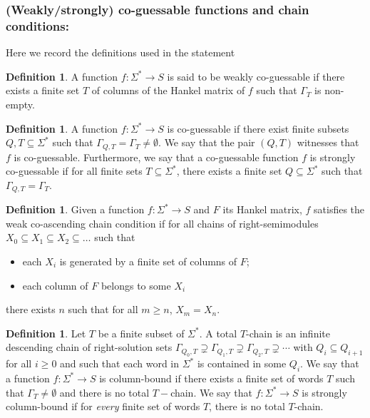 \documentclass[10pt,a4paper]{amsart}
\theoremstyle{definition}
\newtheorem{defi}[thm]{Definition}
\numberwithin{equation}{section}
\numberwithin{theorem}{section}
\begin{document}
\subsubsection*{\textbf{(Weakly/strongly) co-guessable functions and chain conditions:}}
Here we record the definitions used in the statement
\begin{defi}
A function $f: \Sigma^* \rightarrow S$ is said to be weakly co-guessable if there exists a finite set $T$ of columns of the Hankel matrix of $f$ such that $\Gamma_T$ is non-empty.	
\end{defi}

\begin{defi}
	A function $f: \Sigma^* \rightarrow S$ is co-guessable if there exist finite subsets $Q, T \subseteq \Sigma^*$ such that $\Gamma_{Q,T} = \Gamma_{T} \neq \emptyset$. We say that the pair $(Q,T)$ witnesses that $f$ is co-guessable. Furthermore, we say that a co-guessable function $f$ is strongly co-guessable if for all finite sets $T \subseteq \Sigma^*$, there exists a finite set $Q \subseteq \Sigma^*$ such that $\Gamma_{Q,T} = \Gamma_{T}$.
\end{defi}

\begin{defi}
Given a function $f:\Sigma^* \to S$ and $F$ its Hankel matrix, $f$ satisfies the weak co-ascending chain condition if for all chains of right-semimodules $X_0 \subseteq X_1 \subseteq X_2 \subseteq \ldots $ such that
\begin{itemize}
    \item each $X_i$ is generated by a finite set of columns of $F$;
    \item each column of $F$ belongs to some $X_i$
\end{itemize}
there exists $n$ such that for all $m \geq n$, $X_m = X_n$.
\end{defi}

\begin{defi}
Let $T$ be a finite subset of $\Sigma^*$.
A total $T$-chain is an infinite descending chain of right-solution sets $\Gamma_{Q_0, T} \supsetneq \Gamma_{Q_1, T} \supsetneq \Gamma_{Q_2, T} \supsetneq \cdots$  with $Q_i \subseteq Q_{i+1}$ for all $i \geq 0$ and such that each word in  $\Sigma^*$ is contained in some $Q_i$.
We say that a function $f: \Sigma^* \rightarrow S$ is column-bound if there exists a finite set of words $T$ such that 
$\Gamma_T \neq \emptyset$
 and there is no total $T-$chain.
We say that $f: \Sigma^* \rightarrow S$ is strongly column-bound if for \emph{every} finite set of words $T$, there is no total $T$-chain.
\end{defi}
\end{document}
